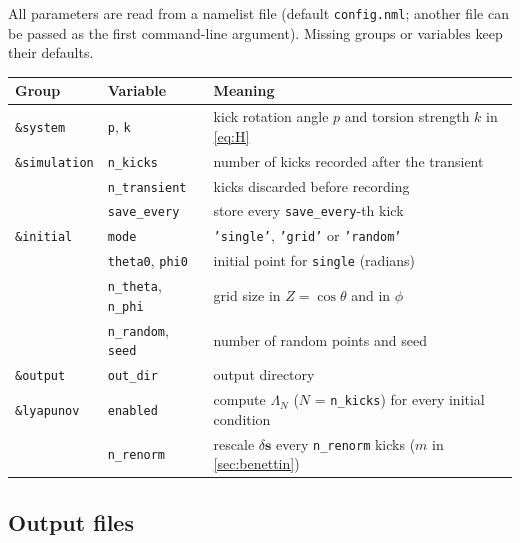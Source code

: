 \documentclass[11pt,a4paper]{article}
\newcommand{\vs}{\bm{s}}
\begin{document}
All parameters are read from a namelist file (default \texttt{config.nml}; another file can be passed as the first
command-line argument). Missing groups or variables keep their defaults.
\begin{center}
\small
\begin{tabular}{lll}
  \toprule
  Group & Variable & Meaning \\
  \midrule
  \texttt{\&system} & \texttt{p}, \texttt{k} & kick rotation angle $p$ and torsion strength $k$ in \eqref{eq:H} \\
  \texttt{\&simulation} & \texttt{n\_kicks} & number of kicks recorded after the transient \\
   & \texttt{n\_transient} & kicks discarded before recording \\
   & \texttt{save\_every} & store every \texttt{save\_every}-th kick \\
  \texttt{\&initial} & \texttt{mode} & \texttt{'single'}, \texttt{'grid'} or \texttt{'random'} \\
   & \texttt{theta0}, \texttt{phi0} & initial point for \texttt{single} (radians) \\
   & \texttt{n\_theta}, \texttt{n\_phi} & grid size in $Z=\cos\theta$ and in $\phi$ \\
   & \texttt{n\_random}, \texttt{seed} & number of random points and seed \\
  \texttt{\&output} & \texttt{out\_dir} & output directory \\
  \texttt{\&lyapunov} & \texttt{enabled} & compute $\Lambda_N$ ($N$ = \texttt{n\_kicks}) for every initial condition \\
   & \texttt{n\_renorm} & rescale $\delta\vs$ every \texttt{n\_renorm} kicks ($m$ in \cref{sec:benettin}) \\
  \bottomrule
\end{tabular}
\end{center}

\subsection{Output files}
\end{document}
